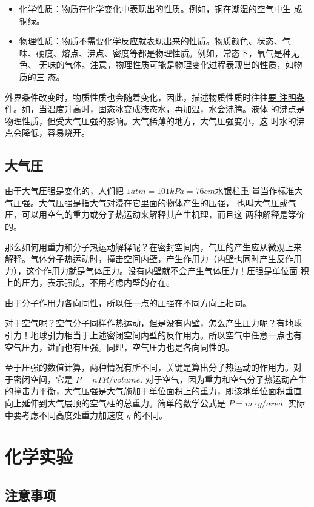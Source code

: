 \begin{itemize}
\item 化学性质：物质在化学变化中表现出的性质。例如，铜在潮湿的空气中生
  成铜绿。
\item 物理性质：物质不需要化学反应就表现出来的性质。物质颜色、状态、气
  味、硬度、熔点、沸点、密度等都是物理性质。例如，常态下，氧气是种无色、
  无味的气体。注意，物理性质可能是物理变化过程表现出的性质，如物质的三
  态。
\end{itemize}

外界条件改变时，物质性质也会随着变化，因此，描述物质性质时往往\uline{要
  注明条件}。如，当温度升高时，固态冰变成液态水，再加温，水会沸腾。液体
的沸点是物理性质，但受大气圧强的影响。大气稀薄的地方，大气圧强变小，这
时水的沸点会降低，容易烧开。

\subsection{大气圧}

由于大气圧强是变化的，人们把 $1 atm = 101 kPa = 76 cm \text{水银柱重
  量}$当作标准大气圧强。大气压强是指大气对浸在它里面的物体产生的压强，
也叫大气圧或气圧，可以用空气的重力或分子热运动来解释其产生机理，而且这
两种解释是等价的。

那么如何用重力和分子热运动解释呢？在密封空间内，气圧的产生应从微观上来
解释。气体分子热运动时，撞击空间内壁，产生作用力（内壁也同时产生反作用
力），这个作用力就是气体圧力。没有内壁就不会产生气体圧力！圧强是单位面
积上的圧力，表示强度，不用考虑内壁的存在。

由于分子作用力各向同性，所以任一点的圧强在不同方向上相同。

对于空气呢？空气分子同样作热运动，但是没有内壁，怎么产生圧力呢？有地球
引力！地球引力相当于上述密闭空间内壁的反作用力。所以空气中任意一点也有
空气圧力，进而也有圧强。同理，空气圧力也是各向同性的。

至于圧强的数值计算，两种情况有所不同，关键是算出分子热运动的作用力。对
于密闭空间，它是 $P = nTR/volume$. 对于空气，因为重力和空气分子热运动产生
的撞击力平衡，大气压强是大气施加于单位面积上的重力，即该地单位面积垂直
向上延伸到大气层顶的空气柱的总重力。简单的数学公式是 $P = m \cdot
g/area$. 实际中要考虑不同高度处重力加速度 $g$ 的不同。

\section{化学实验}

\subsection{注意事项}

